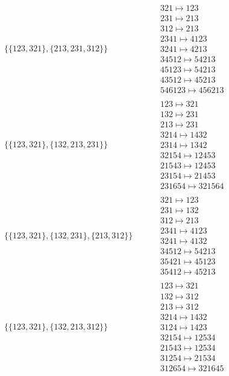 \begin{tiny}
\begin{align}
\begin{matrix}
\end{matrix}
\\
\{\{123, 321\}, \{213, 231, 312\}\}
\quad
&
\phantom{.}
&
\begin{matrix}
321 \mapsto 123\\231 \mapsto 213\\312 \mapsto 213\\2341 \mapsto 4123\\3241 \mapsto 4213\\34512 \mapsto 54213\\45123 \mapsto 54213\\43512 \mapsto 45213\\546123 \mapsto 456213
\end{matrix}
\\
\{\{123, 321\}, \{132, 213, 231\}\}
\quad
&
\phantom{.}
&
\begin{matrix}
123 \mapsto 321\\132 \mapsto 231\\213 \mapsto 231\\3214 \mapsto 1432\\2314 \mapsto 1342\\32154 \mapsto 12453\\21543 \mapsto 12453\\23154 \mapsto 21453\\231654 \mapsto 321564
\end{matrix}
\\
\{\{123, 321\}, \{132, 231\}, \{213, 312\}\}
\quad
&
\phantom{.}
&
\begin{matrix}
321 \mapsto 123\\231 \mapsto 132\\312 \mapsto 213\\2341 \mapsto 4123\\3241 \mapsto 4132\\34512 \mapsto 54213\\35421 \mapsto 45123\\35412 \mapsto 45213
\end{matrix}
\\
\{\{123, 321\}, \{132, 213, 312\}\}
\quad
&
\phantom{.}
&
\begin{matrix}
123 \mapsto 321\\132 \mapsto 312\\213 \mapsto 312\\3214 \mapsto 1432\\3124 \mapsto 1423\\32154 \mapsto 12534\\21543 \mapsto 12534\\31254 \mapsto 21534\\312654 \mapsto 321645

\end{matrix}
\end{align}
\end{tiny}
